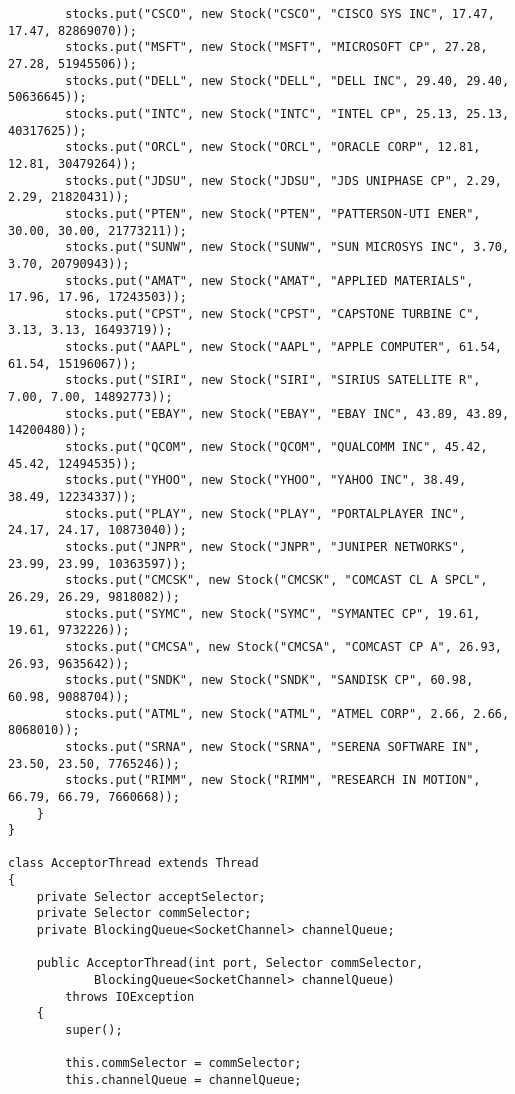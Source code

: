 \documentclass[a4paper,10pt]{article}
\begin{document}
\begin{verbatim}
        stocks.put("CSCO", new Stock("CSCO", "CISCO SYS INC", 17.47, 17.47, 82869070));
        stocks.put("MSFT", new Stock("MSFT", "MICROSOFT CP", 27.28, 27.28, 51945506));
        stocks.put("DELL", new Stock("DELL", "DELL INC", 29.40, 29.40, 50636645));
        stocks.put("INTC", new Stock("INTC", "INTEL CP", 25.13, 25.13, 40317625));
        stocks.put("ORCL", new Stock("ORCL", "ORACLE CORP", 12.81, 12.81, 30479264));
        stocks.put("JDSU", new Stock("JDSU", "JDS UNIPHASE CP", 2.29, 2.29, 21820431));
        stocks.put("PTEN", new Stock("PTEN", "PATTERSON-UTI ENER", 30.00, 30.00, 21773211));
        stocks.put("SUNW", new Stock("SUNW", "SUN MICROSYS INC", 3.70, 3.70, 20790943));
        stocks.put("AMAT", new Stock("AMAT", "APPLIED MATERIALS", 17.96, 17.96, 17243503));
        stocks.put("CPST", new Stock("CPST", "CAPSTONE TURBINE C", 3.13, 3.13, 16493719));
        stocks.put("AAPL", new Stock("AAPL", "APPLE COMPUTER", 61.54, 61.54, 15196067));
        stocks.put("SIRI", new Stock("SIRI", "SIRIUS SATELLITE R", 7.00, 7.00, 14892773));
        stocks.put("EBAY", new Stock("EBAY", "EBAY INC", 43.89, 43.89, 14200480));
        stocks.put("QCOM", new Stock("QCOM", "QUALCOMM INC", 45.42, 45.42, 12494535));
        stocks.put("YHOO", new Stock("YHOO", "YAHOO INC", 38.49, 38.49, 12234337));
        stocks.put("PLAY", new Stock("PLAY", "PORTALPLAYER INC", 24.17, 24.17, 10873040));
        stocks.put("JNPR", new Stock("JNPR", "JUNIPER NETWORKS", 23.99, 23.99, 10363597));
        stocks.put("CMCSK", new Stock("CMCSK", "COMCAST CL A SPCL", 26.29, 26.29, 9818082));
        stocks.put("SYMC", new Stock("SYMC", "SYMANTEC CP", 19.61, 19.61, 9732226));
        stocks.put("CMCSA", new Stock("CMCSA", "COMCAST CP A", 26.93, 26.93, 9635642));
        stocks.put("SNDK", new Stock("SNDK", "SANDISK CP", 60.98, 60.98, 9088704));
        stocks.put("ATML", new Stock("ATML", "ATMEL CORP", 2.66, 2.66, 8068010));
        stocks.put("SRNA", new Stock("SRNA", "SERENA SOFTWARE IN", 23.50, 23.50, 7765246));
        stocks.put("RIMM", new Stock("RIMM", "RESEARCH IN MOTION", 66.79, 66.79, 7660668));
    }
}

class AcceptorThread extends Thread
{
    private Selector acceptSelector;
    private Selector commSelector;
    private BlockingQueue<SocketChannel> channelQueue;

    public AcceptorThread(int port, Selector commSelector,
            BlockingQueue<SocketChannel> channelQueue)
        throws IOException
    {
        super();

        this.commSelector = commSelector;
        this.channelQueue = channelQueue;


\end{verbatim}
\end{document}

